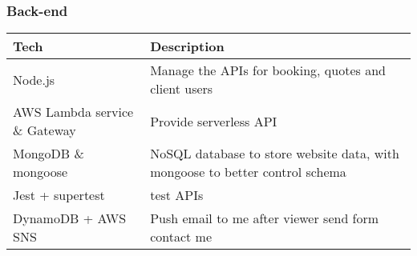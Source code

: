 \documentclass[
  paper=a4,
  ,captions=tableheading
]{scrartcl}
\begin{document}
\hypertarget{back-end}{%
\subsubsection{Back-end}\label{back-end}}

\begin{longtable}[]{@{}ll@{}}
\toprule
\begin{minipage}[b]{0.29\columnwidth}\raggedright
Tech\strut
\end{minipage} & \begin{minipage}[b]{0.65\columnwidth}\raggedright
Description\strut
\end{minipage}\tabularnewline
\midrule
\endhead
\begin{minipage}[t]{0.29\columnwidth}\raggedright
Node.js\strut
\end{minipage} & \begin{minipage}[t]{0.65\columnwidth}\raggedright
Manage the APIs for booking, quotes and client users\strut
\end{minipage}\tabularnewline
\begin{minipage}[t]{0.29\columnwidth}\raggedright
AWS Lambda service \& Gateway\strut
\end{minipage} & \begin{minipage}[t]{0.65\columnwidth}\raggedright
Provide serverless API\strut
\end{minipage}\tabularnewline
\begin{minipage}[t]{0.29\columnwidth}\raggedright
MongoDB \& mongoose\strut
\end{minipage} & \begin{minipage}[t]{0.65\columnwidth}\raggedright
NoSQL database to store website data, with mongoose to better control
schema\strut
\end{minipage}\tabularnewline
\begin{minipage}[t]{0.29\columnwidth}\raggedright
Jest + supertest\strut
\end{minipage} & \begin{minipage}[t]{0.65\columnwidth}\raggedright
test APIs\strut
\end{minipage}\tabularnewline
\begin{minipage}[t]{0.29\columnwidth}\raggedright
DynamoDB + AWS SNS\strut
\end{minipage} & \begin{minipage}[t]{0.65\columnwidth}\raggedright
Push email to me after viewer send form contact me\strut
\end{minipage}\tabularnewline

\end{longtable}
\end{document}
